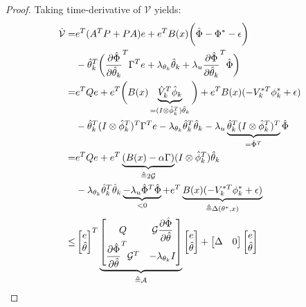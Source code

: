 \documentclass[conference]{IEEEtran}
\begin{document}
\begin{proof}
Taking time-derivative of $\mathcal V$ yields:
\begin{equation}
	\begin{aligned}
		\dot {\mathcal V}
		=&
		e^T(A^TP+PA)e + e^TB(x)
		\bigg(
		\hat\Phi - \Phi^*-\epsilon
		\bigg)
		\\
		&
		-\hat\theta_k^T
		\bigg(
		{\partial \hat\Phi\over\partial \hat\theta_k}^T \Gamma^T e +
		\lambda_{\theta_k} \hat\theta_k
		+\lambda_u{\partial\hat\Phi\over\partial \hat\theta_k}^T \hat\Phi
		\bigg)
		\\
		=&
		e^TQe + e^T
		\bigg(
		B(x) 
		\underbrace{
		\hat V_k^T \hat\phi_k
		}_{= (I\otimes \hat\phi_k^T) \hat\theta_k}
		\bigg)
		+e^T
		B(x)
		(
		-V^{*T}_k \phi^*_k
		+\epsilon
		)
		\\
		&
		-\hat\theta_k^T
		(I\otimes\hat\phi_k^T)
		^T \Gamma^T e 
		-
		\lambda_{\theta_k} 
		\hat\theta_k^T\hat\theta_k
		-
		\lambda_u
		\underbrace{
		\hat\theta_k^T
		(I\otimes\hat\phi_k^T)^T
		}_{=\hat\Phi^T}
		 \hat\Phi
		\\
		=&
		e^TQe + e^T
		\underbrace{
		(B(x)-\alpha \Gamma)
		}_{\triangleq 2 \mathcal G}
		 (I\otimes \hat\phi_k^T)\hat\theta_k
		\\
		&
		-
		\lambda_{\theta_k}
		\hat\theta_k^T\hat\theta_k 
		\underbrace{
		-\lambda_u
		\hat\Phi^T\hat\Phi
		}_{<0}
		+e^T
		\underbrace{
		B(x)
		(
		-V^{*T}_k \phi^*_k
		+\epsilon
		)
		}_{\triangleq \Delta(\theta^*, x)}
		\\
		\le 
		& 
		\begin{bmatrix}
		e\\ \hat\theta
		\end{bmatrix}^T
		\underbrace{
		\begin{bmatrix}
		Q & \mathcal G\dfrac{\partial \hat\Phi}{\partial \hat\theta}
		\\
		\dfrac{\partial \hat\Phi}{\partial \hat\theta}^T\mathcal G^T
		& -\lambda_{\theta_k} I
		\end{bmatrix}
		}_{\triangleq \mathcal A}
		\begin{bmatrix}
			e\\ \hat\theta
		\end{bmatrix}
		+
		\begin{bmatrix}
			\Delta & 0
		\end{bmatrix}
		\begin{bmatrix}
			e\\ \hat\theta
		\end{bmatrix}
	\end{aligned}
\end{equation}

\end{proof}
\end{document}

